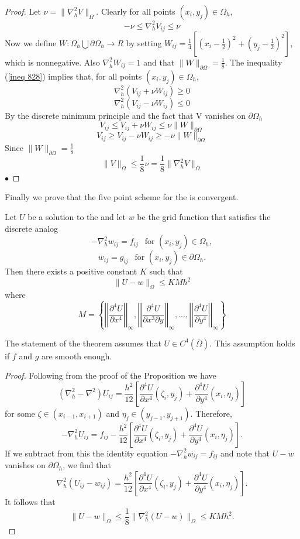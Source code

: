 \begin{proof}
Let $\nu = \lVert \nabla_{h}^2V\rVert_{\Omega}$. Clearly for all points $(x_i,y_j)\in\Omega_h$,
\begin{equation}\label{ineq 828}
-\nu \leq \nabla_{h}^2V_{ij} \leq \nu \end{equation}
Now we define $W:\Omega_h \bigcup \partial\Omega_h \rightarrow R$ by setting 
$W_{ij}=\frac{1}{4}[(x_i-\frac{1}{2})^2+(y_j-\frac{1}{2})^2]$, which is nonnegative.  Also $\nabla_h^2W_{ij}=1$ and that $\lVert W\rVert_{\partial\Omega}=\frac{1}{8}$.
The inequality (\ref{ineq 828}) implies that, for all points $(x_i,y_j)\in\Omega_h$,
\[\nabla_h^2(V_{ij}+\nu W_{ij})\geq 0 \]
\[\nabla_h^2(V_{ij}-\nu W_{ij})\leq 0 \]
By the discrete minimum principle and the fact that V vanishes on $\partial\Omega_h$
\[V_{ij}\leq V_{ij}+\nu W_{ij}\leq \nu\lVert W\rVert_{\partial\Omega} \]
\[V_{ij}\geq V_{ij}-\nu W_{ij}\geq -\nu\lVert W\rVert_{\partial\Omega} \]
Since $\lVert W\rVert_{\partial\Omega}=\frac{1}{8}$
\[\lVert V\rVert_{\Omega}\leq \frac{1}{8}\nu =\frac{1}{8}\lVert \nabla_h^2V\rVert_{\Omega} \]
$\bullet$\end{proof}
Finally we prove that the five point scheme for the  is convergent.
\begin{theorem}
Let $U$ be a solution to the  and let $w$ be the grid function
that satisfies the discrete analog
\[-\nabla_h^2w_{ij}=f_{ij} \ \ \mbox{ for } (x_i,y_j)\in\Omega_h, \]
\[w_{ij}=g_{ij} \ \ \mbox{ for } (x_i,y_j)\in\partial\Omega_h. \]
Then there exists a positive constant $K$ such that
\[\lVert U-w\rVert_{\Omega}\leq KMh^2 \]
where
\[ M=\left\{
\left|\left|\frac{\partial^4 U}{\partial x^4} \right|\right|_{\infty},
\left|\left|\frac{\partial^4 U}{\partial x^3\partial y} \right|\right|_{\infty},
...,
\left|\left|\frac{\partial^4 U}{\partial y^4} \right|\right|_{\infty}
 \right\}
\]
\end{theorem}
The statement of the theorem assumes that $U\in C^4(\bar{\Omega})$. This assumption
holds if $f$ and $g$ are smooth enough.
\begin{proof}
Following from the proof of the Proposition we have
\[ (\nabla_h^2-\nabla^2)U_{ij}=\frac{h^2}{12}\left[ \frac{\partial^4 U}{\partial x^4}(\zeta_i,y_j)+\frac{\partial^4 U}{\partial y^4}(x_i,\eta_j) \right]\]
for some $\zeta \in (x_{i-1},x_{i+1})$ and $\eta_j\in(y_{j-1},y_{j+1})$.  Therefore,
\[ -\nabla_h^2U_{ij}=f_{ij}-\frac{h^2}{12}\left[ \frac{\partial^4 U}{\partial x^4}(\zeta_i,y_j)+\frac{\partial^4 U}{\partial y^4}(x_i,\eta_j) \right].\]
If we subtract from this the identity equation $-\nabla_h^2w_{ij}=f_{ij}$ and note
that $U-w$ vanishes on $\partial\Omega_h$, we find that
\[ \nabla_h^2(U_{ij}-w_{ij})=\frac{h^2}{12}\left[ \frac{\partial^4 U}{\partial x^4}(\zeta_i,y_j)+\frac{\partial^4 U}{\partial y^4}(x_i,\eta_j) \right].\]
It follows that
\[ \lVert U-w\rVert_{\Omega}\leq\frac{1}{8}\lVert \nabla_h^2(U-w)\rVert_{\Omega}\leq KMh^2.\]
\end{proof}